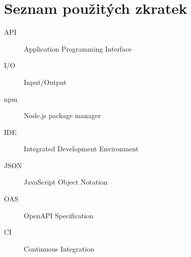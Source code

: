 \documentclass[thesis=B,czech]{FITthesis}[2012/06/26]
\begin{document}
\begin{conclusion}
\end{conclusion}




\appendix

\chapter{Seznam použitých zkratek}
\begin{description}
	\item[API] Application Programming Interface
	\item[I/O] Input/Output
	\item[npm] Node.js package manager
	\item[IDE] Integrated Development Environment
	\item[JSON] JavaScript Object Notation
	\item[OAS] OpenAPI Specification
	\item[CI] Continuous Integration
\end{description}
\end{document}
